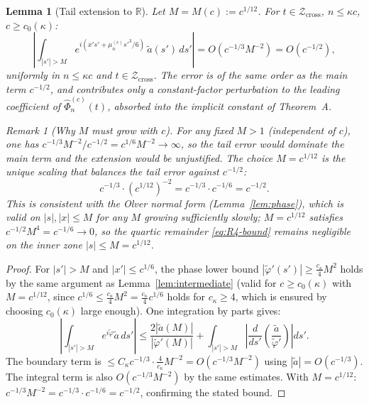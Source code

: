 \documentclass[12pt,a4paper]{amsart}
\newtheorem{lemma}[theorem]{Lemma}
\theoremstyle{definition}
\theoremstyle{remark}
\newtheorem{remark}[theorem]{Remark}
\newcommand{\Zcross}{\mathcal{Z}_{\mathrm{cross}}}
\begin{document}
\begin{lemma}[Tail extension to $\mathbb{R}$]
\label{lem:tail-ext}
Let $M = M(c) := c^{1/12}$.
For $t \in \Zcross$, $n \le \kappa c$,
$c \ge c_0(\kappa)$:
\[
\left|
\int_{|s'| > M}
e^{i(x's' + \mu_n^{(c)}s'^3/6)}\,
\tilde{a}(s')\,ds'
\right|
= O(c^{-1/3} M^{-2})
= O(c^{-1/2}),
\]
uniformly in $n \le \kappa c$ and $t \in \Zcross$.
The error is of the same order as the main term
$c^{-1/2}$, and contributes only a
constant-factor perturbation to the
leading coefficient of
$\widehat{\Phi}_n^{(c)}(t)$,
absorbed into the implicit constant
of Theorem~A.

\begin{remark}[Why $M$ must grow with $c$]
\label{rem:M-growth}
For any \emph{fixed} $M > 1$ (independent of $c$),
one has
$c^{-1/3}M^{-2}/c^{-1/2} = c^{1/6}M^{-2} \to \infty$,
so the tail error would dominate the main term
and the extension would be unjustified.
The choice $M = c^{1/12}$ is the unique
scaling that balances the tail error
against $c^{-1/2}$:
\[
  c^{-1/3} \cdot (c^{1/12})^{-2}
  = c^{-1/3} \cdot c^{-1/6}
  = c^{-1/2}.
\]
This is consistent with the Olver normal form
(Lemma~\ref{lem:phase}), which is valid on
$|s|, |x| \le M$ for any $M$ growing
sufficiently slowly; $M = c^{1/12}$ satisfies
$c^{-1/2}M^4 = c^{-1/6} \to 0$,
so the quartic remainder \eqref{eq:R4-bound}
remains negligible on the inner zone
$|s| \le M = c^{1/12}$.
\end{remark}
\end{lemma}

\begin{proof}
For $|s'| > M$ and $|x'| \le c^{1/6}$,
the phase lower bound
$|\tilde\varphi'(s')| \ge \tfrac{c_\kappa}{4}M^2$
holds by the same argument as
Lemma~\ref{lem:intermediate}
(valid for $c \ge c_0(\kappa)$ with $M = c^{1/12}$,
since $c^{1/6} \le \tfrac{c_\kappa}{4}M^2 = \tfrac{c_\kappa}{4}c^{1/6}$
holds for $c_\kappa \ge 4$, which is ensured
by choosing $c_0(\kappa)$ large enough).
One integration by parts gives:
\[
\left|\int_{|s'|>M}
e^{i\tilde\varphi}\tilde{a}\,ds'\right|
\le \frac{2|\tilde{a}(M)|}{|\tilde\varphi'(M)|}
+ \int_{|s'|>M}
\left|\frac{d}{ds'}\!\left(
\frac{\tilde{a}}{\tilde\varphi'}\right)\right|ds'.
\]
The boundary term is
$\le C_\kappa c^{-1/3} \cdot \tfrac{4}{c_\kappa}M^{-2}
= O(c^{-1/3}M^{-2})$
using $|\tilde{a}| = O(c^{-1/3})$.
The integral term is also $O(c^{-1/3}M^{-2})$
by the same estimates.
With $M = c^{1/12}$:
$c^{-1/3}M^{-2} = c^{-1/3} \cdot c^{-1/6} = c^{-1/2}$,
confirming the stated bound.
\end{proof}
\end{document}

